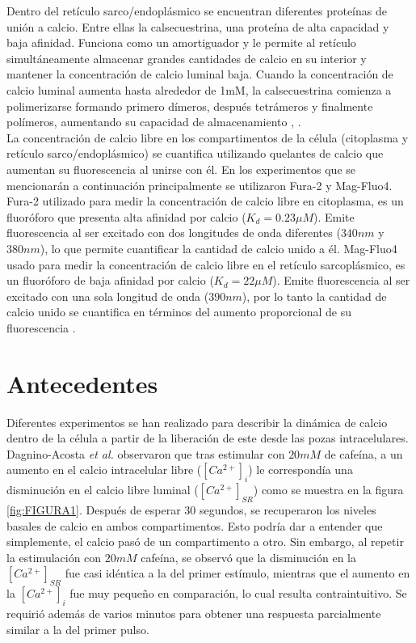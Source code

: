 \documentclass[draft]{article}
\newcommand{\Cai}{[Ca^{2+}]_{i}}
\newcommand{\Cal}{[Ca^{2+}]_{SR}}
\newcommand{\al}{\textit{et al.} }
\begin{document}
Dentro del retículo sarco/endoplásmico se encuentran diferentes proteínas de unión a calcio. Entre ellas la calsecuestrina, una proteína de alta capacidad y baja afinidad. Funciona como un amortiguador y le permite al retículo simultáneamente almacenar grandes cantidades de calcio en su interior y mantener la concentración de calcio luminal baja. Cuando la concentración de calcio luminal aumenta hasta alrededor de 1mM, la calsecuestrina comienza a polimerizarse formando primero dímeros, después tetrámeros y finalmente polímeros, aumentando su capacidad de almacenamiento \cite{Beard2004}, \cite{Park2004a}. \\

La concentración de calcio libre en los compartimentos de la célula (citoplasma y retículo sarco/endoplásmico) se cuantifica utilizando quelantes de calcio que aumentan su fluorescencia al unirse con él. En los experimentos que se mencionarán a continuación principalmente se utilizaron Fura-2 y Mag-Fluo4. Fura-2 utilizado para medir la concentración de calcio libre en citoplasma, es un fluoróforo que presenta alta afinidad por calcio ($K_d=0.23\mu M$). Emite fluorescencia al ser excitado con dos longitudes de onda diferentes ($340nm$ y $380nm$), lo que permite cuantificar la cantidad de calcio unido a él. Mag-Fluo4 usado para medir la concentración de calcio libre en el retículo sarcoplásmico, es un fluoróforo de baja afinidad por calcio ($K_d=22\mu M$). Emite fluorescencia al ser excitado con una sola longitud de onda ($390nm$), por lo tanto la cantidad de calcio unido se cuantifica en términos del aumento proporcional de su fluorescencia \cite{Takahashi1999}.



\section{Antecedentes}

Diferentes experimentos se han realizado para describir la dinámica de calcio dentro de la célula a partir de la liberación de este desde las pozas intracelulares. Dagnino-Acosta \al \cite{Dagnino-Acosta2009} observaron que tras estimular con $20 mM$ de cafeína, a un aumento en el calcio intracelular libre ($\Cai$) le correspondía una disminución en el calcio libre luminal ($\Cal$) como se muestra en la figura \ref{fig:FIGURA1}. Después de esperar $30$ segundos, se recuperaron los niveles basales de calcio en ambos compartimentos. Esto podría dar a entender que simplemente, el calcio pasó de un compartimento a otro. Sin embargo, al repetir la estimulación con $20 mM$  cafeína, se observó que la disminución en la $\Cal$ fue casi idéntica a la del primer estímulo, mientras que el aumento en la $\Cai$ fue muy pequeño en comparación, lo cual resulta contraintuitivo. Se requirió además de varios minutos para obtener una respuesta parcialmente similar a la del primer pulso. \\
\end{document}
